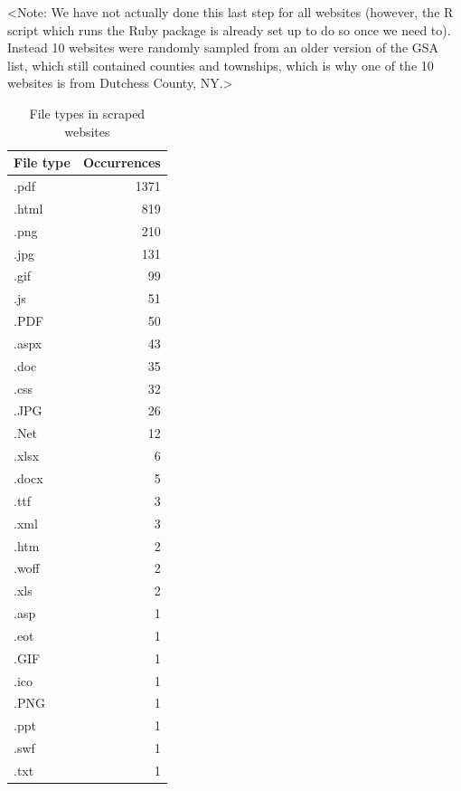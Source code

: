 \documentclass[11pt]{article}
\begin{document}
<Note: We have not actually done this last step for all websites (however, the R script which runs the Ruby package is already set up to do so once we need to). Instead 10 websites were randomly sampled from an older version of the GSA list, which still contained counties and townships, which is why one of the 10 websites is from Dutchess County, NY.>

\begin{table}[ht]
	\centering
	\begin{tabular}{lr}
		\hline
		File type & Occurrences \\ 
		\hline
		.pdf & 1371 \\ 
		.html & 819 \\ 
		.png & 210 \\ 
		.jpg & 131 \\ 
		.gif &  99 \\ 
		.js &  51 \\ 
		.PDF &  50 \\ 
		.aspx &  43 \\ 
		.doc &  35 \\ 
		.css &  32 \\ 
		.JPG &  26 \\ 
		.Net &  12 \\ 
		.xlsx &   6 \\ 
		.docx &   5 \\ 
		.ttf &   3 \\ 
		.xml &   3 \\ 
		.htm &   2 \\ 
		.woff &   2 \\ 
		.xls &   2 \\ 
		.asp &   1 \\ 
		.eot &   1 \\ 
		.GIF &   1 \\ 
		.ico &   1 \\ 
		.PNG &   1 \\ 
		.ppt &   1 \\ 
		.swf &   1 \\ 
		.txt &   1 \\ 
		\hline
	\end{tabular}
	\caption{File types in scraped websites} 
\end{table}
\end{document}

